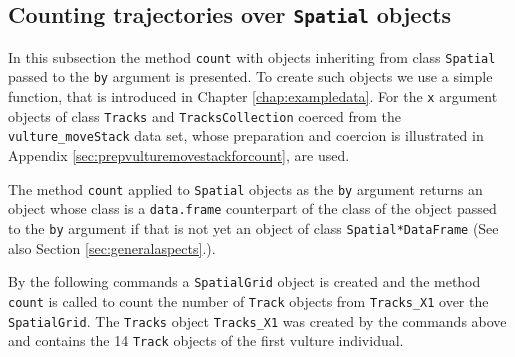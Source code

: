 \documentclass[12pt, oneside, a4paper]{scrbook}
\let\code=\texttt
\newcommand{\codeintitles}[1]{{\tt #1}} %
\begin{document}

\subsection{Counting trajectories over \codeintitles{Spatial} objects}
\label{subsec:countoverspatial}

In this subsection the method \code{count} with objects inheriting from class \code{Spatial} passed to the \code{by} argument is presented. To create such objects we use a simple function, that is introduced in Chapter \ref{chap:exampledata}. For the \code{x} argument objects of class \code{Tracks} and \code{TracksCollection} coerced from the \code{vulture\_moveStack} data set, whose preparation and coercion is illustrated in Appendix \ref{sec:prepvulturemovestackforcount}, are used.
\par\medskip



The method \code{count} applied to \code{Spatial} objects as the \code{by} argument returns an object whose class is a \code{data.frame} counterpart of the class of the object passed to the \code{by} argument if that is not yet an object of class \code{Spatial*DataFrame} (See also Section \ref{sec:generalaspects}.).

\par\medskip

By the following commands a \code{SpatialGrid} object is created and the method \code{count} is called to count the number of \code{Track} objects from \code{Tracks\_X1} over the \code{SpatialGrid}. The \code{Tracks} object \code{Tracks\_X1} was created by the commands above and contains the 14 \code{Track} objects of the first vulture individual.

\par\medskip

\end{document}
